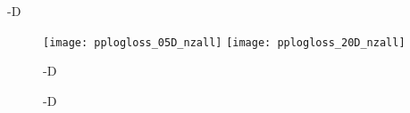 \documentclass[sigconf]{acmart}
\newcommand{\bbobdatapath}{ppdata/} %
\begin{document}
{\begin{table*}
{\begin{minipage}[t]{0.499\textwidth}
-D\\
\tiny
\pptableheader 
 




























\pptablefooter
\end{minipage}}
\vspace{1em}

\caption[Table of aRTs]{\label{tab:aRTs}
}
\end{table*}




\begin{figure}
\centering
\texttt{[image: pplogloss\_05D\_nzall]}%
\texttt{[image: pplogloss\_20D\_nzall]}
\\[-6.2ex]
\parbox{0.49\columnwidth}{-D}%
\parbox{0.49\columnwidth}{-D}\\[5ex]
%
\\

\caption{\label{tab:aRTloss}%
\bbobloglosstablecaption{}
}
\end{figure}



}
\end{document}
